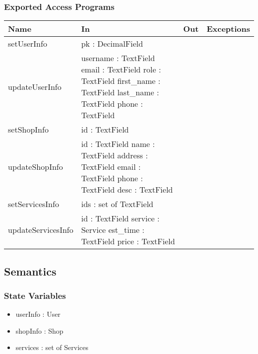 \documentclass[12pt, titlepage]{article}
\begin{document}
        \subsubsection{Exported Access Programs}
            \begin{center}
                \begin{tabular}{p{3.5cm} p{4cm} p{2cm} p{2.5cm}}
                    \toprule
                    \textbf{Name} & \textbf{In} & \textbf{Out} & \textbf{Exceptions} \\
                    \midrule
                    setUserInfo & pk : DecimalField & & \\
                    updateUserInfo & username : TextField \newline email : TextField \newline role : TextField \newline first\_name : TextField \newline last\_name : TextField \newline phone : TextField & & \\
                    setShopInfo & id : TextField & & \\
                    updateShopInfo & id : TextField \newline name : TextField \newline address : TextField \newline email : TextField \newline phone : TextField \newline desc : TextField \newline & & \\
                    setServicesInfo & ids : set of TextField & & \\
                    updateServicesInfo & id : TextField \newline service : Service \newline est\_time : TextField \newline price : TextField & & \\
                    \bottomrule
                \end{tabular}
            \end{center}
    \subsection{Semantics}
        \subsubsection{State Variables}
            \begin{itemize}
                \item userInfo : User
                \item shopInfo : Shop
                \item services : set of Services
            \end{itemize}
\end{document}
